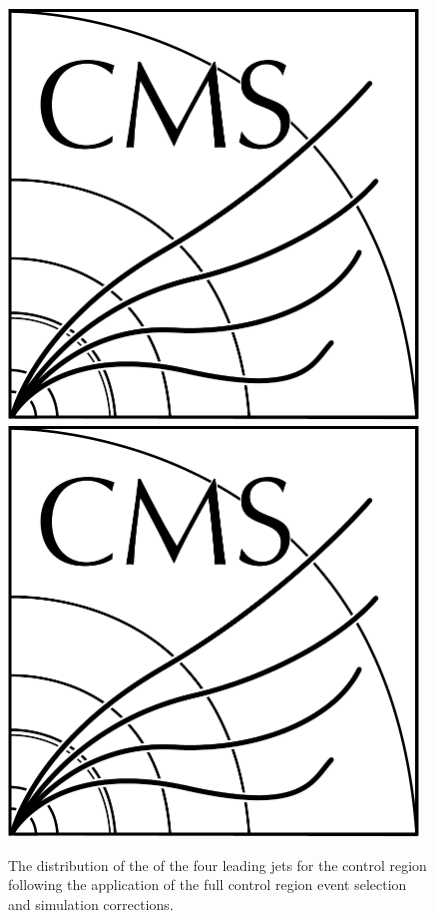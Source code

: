 \begin{figure}[htb]
\includegraphics[width=0.97\textwidth]{CMS-bw-logo.pdf}
\\
\includegraphics[width=0.97\textwidth]{CMS-bw-logo.pdf}
\caption{
The distribution of the \pt of the four leading jets for the \ttbar control region following the application of the full control region event selection and simulation corrections.
}
\label{fig:ttbarCR_jetPt}
\end{figure}

